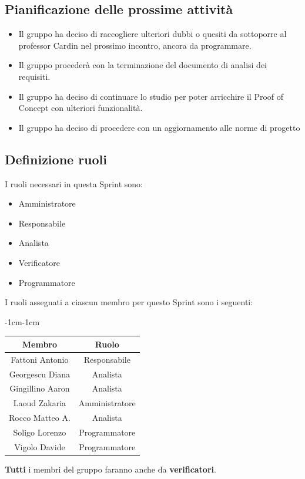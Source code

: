 \documentclass[a4paper,12pt]{article}
\begin{document}
\subsection{Pianificazione delle prossime attività}
\begin{itemize}
    \item Il gruppo ha deciso di raccogliere ulteriori dubbi o quesiti da sottoporre al professor Cardin nel prossimo incontro, ancora da programmare.
    \item Il gruppo procederà con la terminazione del documento di analisi dei requisiti.
    \item Il gruppo ha deciso di continuare lo studio per poter arricchire il Proof of Concept con ulteriori funzionalità.
    \item Il gruppo ha deciso di procedere con un aggiornamento alle norme di progetto
\end{itemize}


\subsection{Definizione ruoli}
I ruoli necessari in questa Sprint sono:
\begin{itemize}[noitemsep]
    \item Amministratore
    \item Responsabile
    \item Analista
    \item Verificatore
    \item Programmatore
\end{itemize}

I ruoli assegnati a ciascun membro per questo Sprint sono i seguenti:
\begin{table}[H]
    \begin{adjustwidth}{-1cm}{-1cm}
    \centering
\begin{tabular}{|c|c|}
    \hline
    \textbf{Membro} & \textbf{Ruolo} \\
    \hline
    Fattoni Antonio & Responsabile \\
    \hline
    Georgescu Diana & Analista \\
    \hline
    Gingillino Aaron & Analista \\
    \hline
    Laoud Zakaria & Amministratore \\
    \hline
    Rocco Matteo A. & Analista \\
    \hline
    Soligo Lorenzo & Programmatore \\
    \hline
    Vigolo Davide & Programmatore \\
    \hline
\end{tabular}
    \end{adjustwidth}
\end{table}
\textbf{Tutti} i membri del gruppo faranno anche da \textbf{verificatori}.
\end{document}
